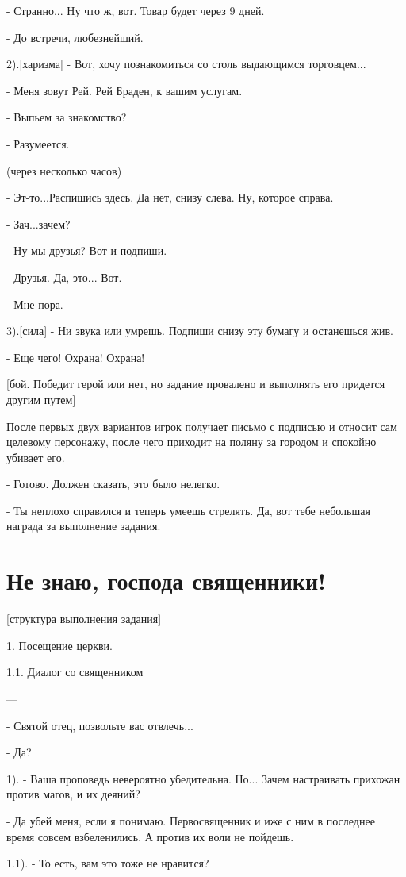 \documentclass[12pt,a4paper]{book}
\begin{document}
- Странно... Ну что ж, вот. Товар будет через 9 дней.

- До встречи, любезнейший.

2).[харизма] - Вот, хочу познакомиться со столь выдающимся торговцем...

- Меня зовут Рей. Рей Браден, к вашим услугам.

- Выпьем за знакомство?

- Разумеется.

(через несколько часов)

- Эт-то...Распишись здесь. Да нет, снизу слева. Ну, которое справа.

- Зач...зачем?

- Ну мы друзья? Вот и подпиши.

- Друзья. Да, это... Вот.

- Мне пора. 

3).[сила] - Ни звука или умрешь. Подпиши снизу эту бумагу и останешься жив.

- Еще чего! Охрана! Охрана!

[бой. Победит герой или нет, но задание провалено и выполнять его придется другим путем]

После первых двух вариантов игрок получает письмо с подписью и относит сам целевому персонажу, после чего приходит на поляну за городом и спокойно убивает его.

- Готово. Должен сказать, это было нелегко.

- Ты неплохо справился и теперь умеешь стрелять. Да, вот тебе небольшая награда за выполнение задания.

\section{Не знаю, господа священники!}

[структура выполнения задания]

1. Посещение церкви.

1.1. Диалог со священником

---

- Святой отец, позвольте вас отвлечь...

- Да?

1). - Ваша проповедь невероятно убедительна. Но... Зачем настраивать прихожан против магов, и их деяний?

- Да убей меня, если я понимаю. Первосвященник и иже с ним в последнее время совсем взбеленились. А против их воли не пойдешь.

1.1). - То есть, вам это тоже не нравится?
\end{document}
